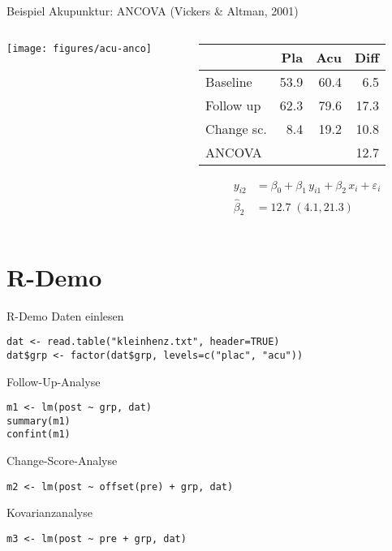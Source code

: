 \documentclass{beamer}
\begin{document}
\begin{frame}{Beispiel}
Akupunktur: ANCOVA (Vickers \& Altman, 2001)
\begin{columns}[T]
\begin{column}{5.5cm}
  \texttt{[image: figures/acu-anco]}
\end{column}
%
\begin{column}{5.5cm}
  \vspace*{1em}\small
  \begin{tabular}{lrrr}
  \hline
             &  Pla &  Acu & Diff \\ \hline
  Baseline   & 53.9 & 60.4 &  6.5 \\
  Follow up  & 62.3 & 79.6 & 17.3 \\
  Change sc. &  8.4 & 19.2 & 10.8 \\
  ANCOVA     &      &      & 12.7 \\ \hline
  \end{tabular}
\begin{align*}
         y_{i2} &= \beta_0 + \beta_1 \, y_{i1} + \beta_2 \, x_i +
                    \varepsilon_i \\
  \hat{\beta}_2 &= 12.7 \; (4.1, 21.3)
\end{align*}
\end{column}
\end{columns}
\end{frame}


\section{R-Demo}


\begin{frame}[fragile]{R-Demo}{}
%
Daten einlesen
\begin{lstlisting}
dat <- read.table("kleinhenz.txt", header=TRUE)
dat$grp <- factor(dat$grp, levels=c("plac", "acu"))
\end{lstlisting}

%
Follow-Up-Analyse
\begin{lstlisting}
m1 <- lm(post ~ grp, dat)
summary(m1)
confint(m1)
\end{lstlisting}

%
Change-Score-Analyse
\begin{lstlisting}
m2 <- lm(post ~ offset(pre) + grp, dat)
\end{lstlisting}

Kovarianzanalyse
\begin{lstlisting}
m3 <- lm(post ~ pre + grp, dat)
\end{lstlisting}
%
%
\end{frame}
\end{document}
